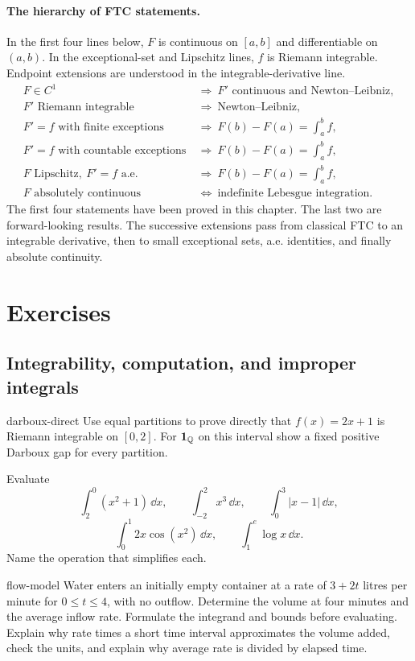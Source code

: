 \paragraph{The hierarchy of FTC statements.}
In the first four lines below, $F$ is continuous on $[a,b]$ and
differentiable on $(a,b)$. In the exceptional-set and Lipschitz lines,
$f$ is Riemann integrable. Endpoint extensions are understood in the
integrable-derivative line.
\[
\begin{aligned}
F\in C^1&\ \Longrightarrow\ F'\text{ continuous and Newton--Leibniz},\\
F'\text{ Riemann integrable}&\ \Longrightarrow\ \text{Newton--Leibniz},\\
F'=f\text{ with finite exceptions}&\ \Longrightarrow\ F(b)-F(a)=\int_a^b f,\\
F'=f\text{ with countable exceptions}&\ \Longrightarrow\ F(b)-F(a)=\int_a^b f,\\
F\text{ Lipschitz},\ F'=f\text{ a.e.}&\ \Longrightarrow\ F(b)-F(a)=\int_a^b f,\\
F\text{ absolutely continuous}&\ \Longleftrightarrow\
\text{indefinite Lebesgue integration}.
\end{aligned}
\]
The first four statements have been proved in this chapter. The last two
are forward-looking results. The successive extensions pass from
classical FTC to an integrable derivative, then to small exceptional
sets, a.e. identities, and finally absolute continuity.


\section*{Exercises}

\subsection*{Integrability, computation, and improper integrals}

\begin{hexercise}{darboux-direct}
Use equal partitions to prove directly that $f(x)=2x+1$ is Riemann integrable on $[0,2]$. For $\mathbf1_{\mathbb{Q}}$ on this interval show a fixed positive Darboux gap for every partition.
\end{hexercise}

\begin{exercise}
Evaluate
\[
\int_2^0(x^2+1)\,\dd x,\qquad
\int_{-2}^2x^3\,\dd x,\qquad
\int_0^3|x-1|\,\dd x ,
\]
\[
\int_0^1 2x\cos(x^2)\,\dd x,\qquad
\int_1^e\log x\,\dd x.
\]
Name the operation that simplifies each.
\end{exercise}
\begin{hexercise}{flow-model}
Water enters an initially empty container at a rate of $3+2t$ litres per minute for $0\leq t\leq4$, with no outflow. Determine the volume at four minutes and the average inflow rate. Formulate the integrand and bounds before evaluating. Explain why rate times
a short time interval approximates the volume added, check the units, and
explain why average rate is divided by elapsed time.
\end{hexercise}

